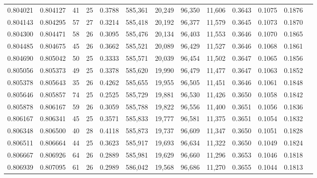 \begin{tabular}{rrrrrrrrrrrrr}
0.804021 & 0.804127 &    41 &  25 &                                     0.3788 & 585,361 &  20,249 &  96,350 &  11,606 & 0.3643 & 0.1075 & 0.1876 \\
0.804143 & 0.804295 &    57 &  27 &                                     0.3214 & 585,418 &  20,192 &  96,377 &  11,579 & 0.3645 & 0.1073 & 0.1870 \\
0.804300 & 0.804471 &    58 &  26 &                                     0.3095 & 585,476 &  20,134 &  96,403 &  11,553 & 0.3646 & 0.1070 & 0.1865 \\
0.804485 & 0.804675 &    45 &  26 &                                     0.3662 & 585,521 &  20,089 &  96,429 &  11,527 & 0.3646 & 0.1068 & 0.1861 \\
0.804690 & 0.805042 &    50 &  25 &                                     0.3333 & 585,571 &  20,039 &  96,454 &  11,502 & 0.3647 & 0.1065 & 0.1856 \\
0.805056 & 0.805373 &    49 &  25 &                                     0.3378 & 585,620 &  19,990 &  96,479 &  11,477 & 0.3647 & 0.1063 & 0.1852 \\
0.805378 & 0.805643 &    35 &  26 &                                     0.4262 & 585,655 &  19,955 &  96,505 &  11,451 & 0.3646 & 0.1061 & 0.1848 \\
0.805646 & 0.805857 &    74 &  25 &                                     0.2525 & 585,729 &  19,881 &  96,530 &  11,426 & 0.3650 & 0.1058 & 0.1842 \\
0.805878 & 0.806167 &    59 &  26 &                                     0.3059 & 585,788 &  19,822 &  96,556 &  11,400 & 0.3651 & 0.1056 & 0.1836 \\
0.806167 & 0.806341 &    45 &  25 &                                     0.3571 & 585,833 &  19,777 &  96,581 &  11,375 & 0.3651 & 0.1054 & 0.1832 \\
0.806348 & 0.806500 &    40 &  28 &                                     0.4118 & 585,873 &  19,737 &  96,609 &  11,347 & 0.3650 & 0.1051 & 0.1828 \\
0.806511 & 0.806664 &    44 &  25 &                                     0.3623 & 585,917 &  19,693 &  96,634 &  11,322 & 0.3650 & 0.1049 & 0.1824 \\
0.806667 & 0.806926 &    64 &  26 &                                     0.2889 & 585,981 &  19,629 &  96,660 &  11,296 & 0.3653 & 0.1046 & 0.1818 \\
0.806939 & 0.807095 &    61 &  26 &                                     0.2989 & 586,042 &  19,568 &  96,686 &  11,270 & 0.3655 & 0.1044 & 0.1813 \\

\end{tabular}
